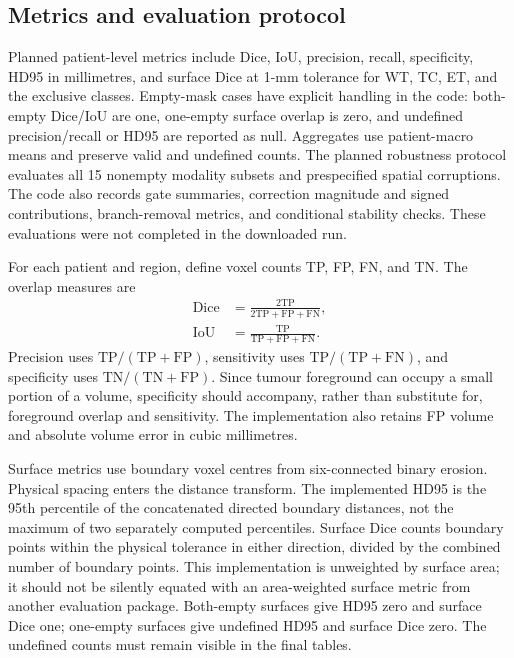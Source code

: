 \documentclass[conference]{IEEEtran}
\begin{document}
\subsection{Metrics and evaluation protocol}
Planned patient-level metrics include Dice, IoU, precision, recall, specificity, HD95 in millimetres, and surface Dice at 1-mm tolerance for WT, TC, ET, and the exclusive classes. Empty-mask cases have explicit handling in the code: both-empty Dice/IoU are one, one-empty surface overlap is zero, and undefined precision/recall or HD95 are reported as null. Aggregates use patient-macro means and preserve valid and undefined counts. The planned robustness protocol evaluates all 15 nonempty modality subsets and prespecified spatial corruptions. The code also records gate summaries, correction magnitude and signed contributions, branch-removal metrics, and conditional stability checks. These evaluations were not completed in the downloaded run.

For each patient and region, define voxel counts TP, FP, FN, and TN. The overlap measures are
\begin{align}
\operatorname{Dice}&=\frac{2\mathrm{TP}}{2\mathrm{TP}+\mathrm{FP}+\mathrm{FN}},\\
\operatorname{IoU}&=\frac{\mathrm{TP}}{\mathrm{TP}+\mathrm{FP}+\mathrm{FN}}.
\end{align}
Precision uses $\mathrm{TP}/(\mathrm{TP}+\mathrm{FP})$, sensitivity uses $\mathrm{TP}/(\mathrm{TP}+\mathrm{FN})$, and specificity uses $\mathrm{TN}/(\mathrm{TN}+\mathrm{FP})$. Since tumour foreground can occupy a small portion of a volume, specificity should accompany, rather than substitute for, foreground overlap and sensitivity. The implementation also retains FP volume and absolute volume error in cubic millimetres.

Surface metrics use boundary voxel centres from six-connected binary erosion. Physical spacing enters the distance transform. The implemented HD95 is the 95th percentile of the concatenated directed boundary distances, not the maximum of two separately computed percentiles. Surface Dice counts boundary points within the physical tolerance in either direction, divided by the combined number of boundary points. This implementation is unweighted by surface area; it should not be silently equated with an area-weighted surface metric from another evaluation package. Both-empty surfaces give HD95 zero and surface Dice one; one-empty surfaces give undefined HD95 and surface Dice zero. The undefined counts must remain visible in the final tables.
\end{document}
